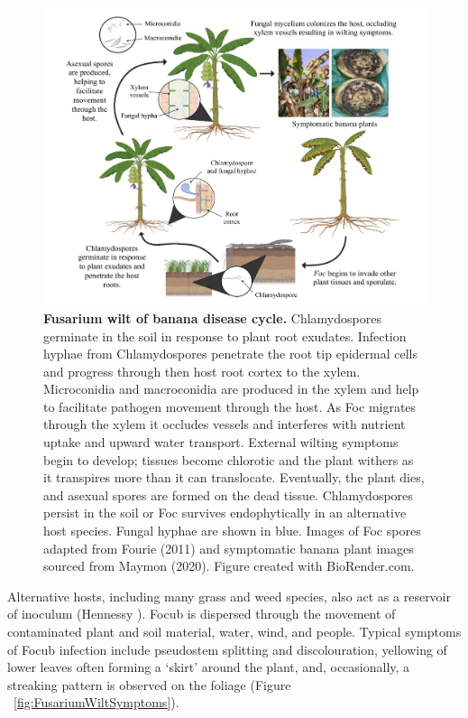 \begin{figure}[hp!]
    \centering
    \includegraphics[width=14cm]{Figures/MyLifeCylceNarrow.pdf}
    \caption[Fusarium wilt of banana disease cycle.]{\textbf{Fusarium wilt of banana disease cycle.} Chlamydospores germinate in the soil in response to plant root exudates. Infection hyphae from Chlamydospores penetrate the root tip epidermal cells and progress through then host root cortex to the xylem. Microconidia and macroconidia are produced in the xylem and help to facilitate pathogen movement through the host. As Foc migrates through the xylem it occludes vessels and interferes with nutrient uptake and upward water transport. External wilting symptoms begin to develop; tissues become chlorotic and the plant withers as it transpires more than it can translocate. Eventually, the plant dies, and asexual spores are formed on the dead tissue. Chlamydospores persist in the soil or Foc survives endophytically in an alternative host species. Fungal hyphae are shown in blue. Images of Foc spores adapted from Fourie \et  (2011) and symptomatic banana plant images sourced from Maymon \et  (2020). Figure created with BioRender.com.}
    \label{fig:MyLifeCycle}
\end{figure}


Alternative hosts, including many grass and weed species, also act as a reservoir of inoculum (Hennessy ).  \ac{Focub} is dispersed through the movement of contaminated plant and soil material, water, wind, and people. Typical symptoms of \ac{Focub} infection include pseudostem splitting and discolouration, yellowing of lower leaves often forming a ‘skirt’ around the plant, and, occasionally, a streaking pattern is observed on the foliage (Figure ~\ref{fig:FusariumWiltSymptoms}). 

